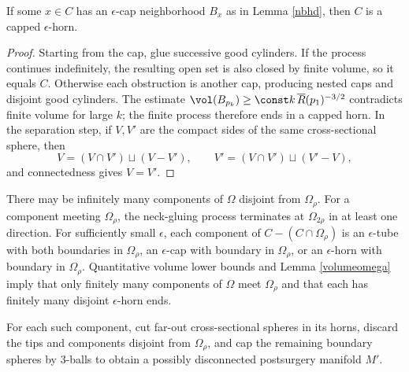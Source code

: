 \begin{lemma}
  \label{lem:kl-structure-at-first-singularity-time-existence-cap-geometry}

If some $x\in C$ has an $\epsilon$-cap neighborhood $B_x$ as in Lemma
\ref{nbhd}, then $C$ is a capped $\epsilon$-horn.
\end{lemma}
\begin{proof}
\sketch Starting from the cap, glue successive good cylinders. If the process
continues indefinitely, the resulting open set is also closed by finite volume,
so it equals $C$. Otherwise each obstruction is another cap, producing nested
caps and disjoint good cylinders. The estimate
$\vol(B_{p_k})\geq\const k\,\overline R(p_1)^{-3/2}$ contradicts finite volume
for large $k$; the finite process therefore ends in a capped horn. In the
separation step, if $V,V'$ are the compact sides of the same cross-sectional
sphere, then
\begin{equation}
\label{eqndecompv}
V=(V\cap V')\sqcup(V-V'),\qquad V'=(V\cap V')\sqcup(V'-V),
\end{equation}
and connectedness gives $V=V'$.
\end{proof}

There may be infinitely many components of $\Omega$ disjoint from $\Omega_\rho$.
For a component meeting $\Omega_\rho$, the neck-gluing process terminates at
$\Omega_{2\rho}$ in at least one direction. For sufficiently small $\epsilon$,
each component of $C-(C\cap\Omega_\rho)$ is an $\epsilon$-tube with both
boundaries in $\Omega_\rho$, an $\epsilon$-cap with boundary in $\Omega_\rho$,
or an $\epsilon$-horn with boundary in $\Omega_\rho$. Quantitative volume
lower bounds and Lemma \ref{volumeomega} imply that only finitely many
components of $\Omega$ meet $\Omega_\rho$ and that each has finitely many
disjoint $\epsilon$-horn ends.

For each such component, cut far-out cross-sectional spheres in its horns,
discard the tips and components disjoint from $\Omega_\rho$, and cap the
remaining boundary spheres by $3$-balls to obtain a possibly disconnected
postsurgery manifold $M'$.

